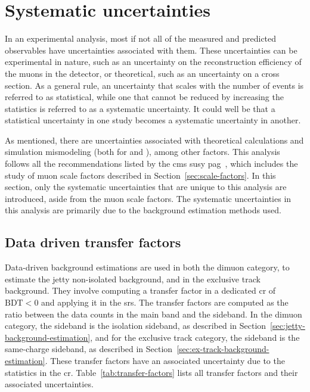 \clearpage
\section{Systematic uncertainties}
\label{sec:systematic-uncertainties}

In an experimental analysis, most if not all of the measured and predicted observables have uncertainties associated with them. These uncertainties can be experimental in nature, such as an uncertainty on the reconstruction efficiency of the muons in the detector, or theoretical, such as an uncertainty on a cross section. As a general rule, an uncertainty that scales with the number of events is referred to as statistical, while one that cannot be reduced by increasing the statistics is referred to as a systematic uncertainty. It could well be that a statistical uncertainty in one study becomes a systematic uncertainty in another.

As mentioned, there are uncertainties associated with theoretical calculations and simulation mismodeling (both for \FASTSIM and \FULLSIM), among other factors. This analysis follows all the recommendations listed by the \gls{cms} \gls{susy} \gls{pag}~\cite{sus-pag-recommendations}, which includes the study of muon scale factors described in Section~\ref{sec:scale-factors}. In this section, only the systematic uncertainties that are unique to this analysis are introduced, aside from the muon scale factors. The systematic uncertainties in this analysis are primarily due to the background estimation methods used.

\subsection{Data driven transfer factors}
\label{sec:data-driven-tranfer-factors}

Data-driven background estimations are used in both the dimuon category, to estimate the jetty non-isolated background, and in the exclusive track background. They involve computing a transfer factor in a dedicated \gls{cr} of $\text{BDT}<0$ and applying it in the \glspl{sr}. The transfer factors are computed as the ratio between the data counts in the main band and the sideband. In the dimuon category, the sideband is the isolation sideband, as described in Section~\ref{sec:jetty-background-estimation}, and for the exclusive track category, the sideband is the same-charge sideband, as described in Section~\ref{sec:ex-track-background-estimation}. These transfer factors have an associated uncertainty due to the statistics in the \gls{cr}. Table~\ref{tab:transfer-factors} lists all transfer factors and their associated uncertainties.


